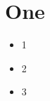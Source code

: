 \documentclass[class=article, crop=false]{standalone}
\begin{document}
\section*{One}%
\label{sec:One}

\begin{itemize}
  \item 1
  \item 2
  \item 3
\end{itemize}
\end{document}

